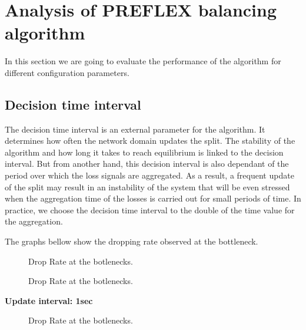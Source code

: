 \section{Analysis of PREFLEX balancing algorithm}

In this section we are going to evaluate the performance of the algorithm for different configuration parameters. 

\subsection{Decision time interval}

The decision time interval is an external parameter for the algorithm. It determines how often the network domain updates the split. The stability of the algorithm and how long it takes to reach equilibrium is linked to the decision interval. But from another hand, this decision interval is also dependant of the period over which the loss signals are aggregated. As a result, a frequent update of the split may result in an instability of the system that will be even stressed when the aggregation time of the losses is carried out for small periods of time. In practice, we choose the decision time interval to the double of the time value for the aggregation.

The graphs bellow show the dropping rate observed at the bottleneck. 

\begin{figure}[h]
 \begin{center}

\caption{
  Drop Rate at the botlenecks. 
    \label{fig:split-eight}
}
\end{center}
\end{figure}

 \begin{figure}[h!]
 \begin{center}
\caption{
  Drop Rate at the botlenecks.
    \label{fig:split-time-four}
}
\end{center}
\end{figure}

\clearpage

{\bf Update interval: 1sec}

\begin{figure}[h]
 \begin{center}

\caption{
  Drop Rate at the botlenecks.
    \label{fig:split-one}
}
\end{center}
\end{figure}

